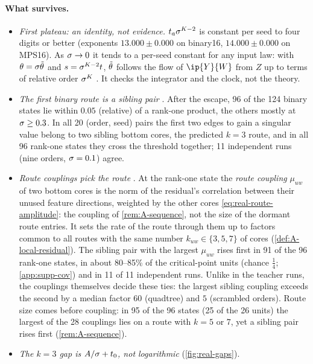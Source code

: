 \paragraph{What survives.}
\begin{itemize}
  \item \emph{First plateau: an identity, not evidence.} $t_a\sigma^{K-2}$ is constant per seed to four
    digits or better (exponents $13.000\pm0.000$ on binary16, $14.000\pm0.000$ on MPS16). As $\sigma\to0$ it tends to a
    per-seed constant for any input law: with $\theta=\sigma\tilde{\theta}$ and $s=\sigma^{K-2}t$, $\tilde{\theta}$ follows the
    flow of $\ip{Y}{\W}$ from $Z$ up to terms of relative order $\sigma^{K}$ \proven{} . It checks the integrator and the clock, not the theory.
  \item \emph{The first binary route is a sibling pair} \empirical{} \newresult. After the escape, 96 of
    the 124 binary states lie within $0.05$ (relative) of a rank-one product, the others mostly at
    $\sigma\ge0.3$. In all 20 (order, seed) pairs the first two edges to gain a singular value belong to two
    sibling bottom cores, the predicted $k=3$ route, and in all 96 rank-one states they cross the threshold
    together; 11 independent runs (nine orders, $\sigma=0.1$) agree.
  \item \emph{Route couplings pick the route} \empirical{} \newresult. At the rank-one state the
    \emph{route coupling} $\mu_{uw}$ of two bottom cores is the norm of the residual's correlation between
    their unused feature directions, weighted by the other cores \eqref{eq:real-route-amplitude}: the coupling
    of \cref{rem:A-sequence}, not the size of the dormant route entries. It sets the rate of the route through
    them up to factors common to all routes with the same number $k_{uw}\in\{3,5,7\}$ of cores
    (\cref{def:A-local-residual}). The sibling pair with the largest $\mu_{uw}$ rises first in 91 of the 96
    rank-one states, in about 80--85\% of the critical-point units (chance $\frac14$; \cref{app:supp-cov}) and in
    11 of 11 independent runs. Unlike in the teacher runs, the couplings themselves decide these ties: the
    largest sibling coupling exceeds the second by a median factor $60$ (quadtree) and $5$ (scrambled
    orders). Route size comes before coupling: in 95 of the 96 states (25 of the 26 units) the largest of the 28
    couplings lies on a route with $k=5$ or $7$, yet a sibling pair rises first (\cref{rem:A-sequence}).
  \item \emph{The $k=3$ gap is $A/\sigma+t_0$, not logarithmic} \empirical{} \newresult{} (\cref{fig:real-gaps}).

\end{itemize}
